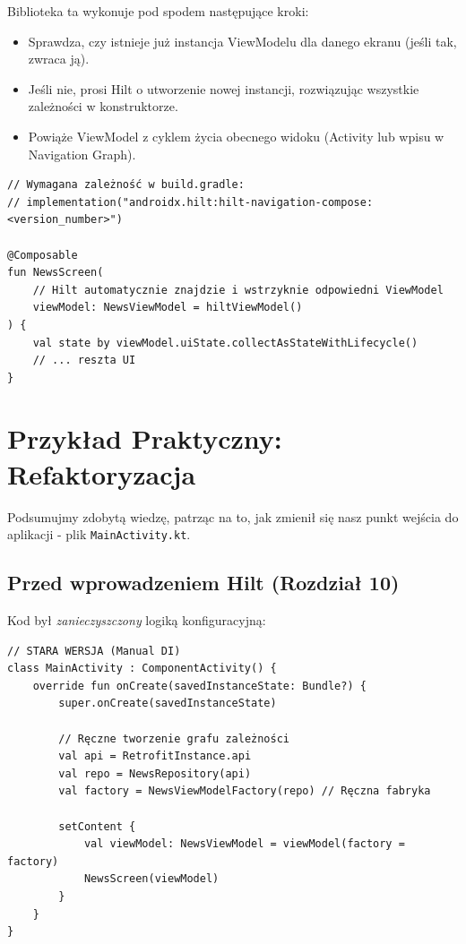 Biblioteka ta wykonuje pod spodem następujące kroki:
\begin{itemize}
    \item Sprawdza, czy istnieje już instancja ViewModelu dla danego ekranu (jeśli tak, zwraca ją).
    \item Jeśli nie, prosi Hilt o utworzenie nowej instancji, rozwiązując wszystkie zależności w konstruktorze.
    \item Powiąże ViewModel z cyklem życia obecnego widoku (Activity lub wpisu w Navigation Graph).
\end{itemize}

\begin{verbatim}
// Wymagana zależność w build.gradle:
// implementation("androidx.hilt:hilt-navigation-compose:<version_number>")

@Composable
fun NewsScreen(
    // Hilt automatycznie znajdzie i wstrzyknie odpowiedni ViewModel
    viewModel: NewsViewModel = hiltViewModel() 
) {
    val state by viewModel.uiState.collectAsStateWithLifecycle()
    // ... reszta UI
}
\end{verbatim}

\section{Przykład Praktyczny: Refaktoryzacja}

Podsumujmy zdobytą wiedzę, patrząc na to, jak zmienił się nasz punkt wejścia do aplikacji - plik \texttt{MainActivity.kt}.

\subsection{Przed wprowadzeniem Hilt (Rozdział 10)}

Kod był \textit{zanieczyszczony} logiką konfiguracyjną:

\begin{verbatim}
// STARA WERSJA (Manual DI)
class MainActivity : ComponentActivity() {
    override fun onCreate(savedInstanceState: Bundle?) {
        super.onCreate(savedInstanceState)
        
        // Ręczne tworzenie grafu zależności
        val api = RetrofitInstance.api
        val repo = NewsRepository(api)
        val factory = NewsViewModelFactory(repo) // Ręczna fabryka

        setContent {
            val viewModel: NewsViewModel = viewModel(factory = factory)
            NewsScreen(viewModel)
        }
    }
}
\end{verbatim}

